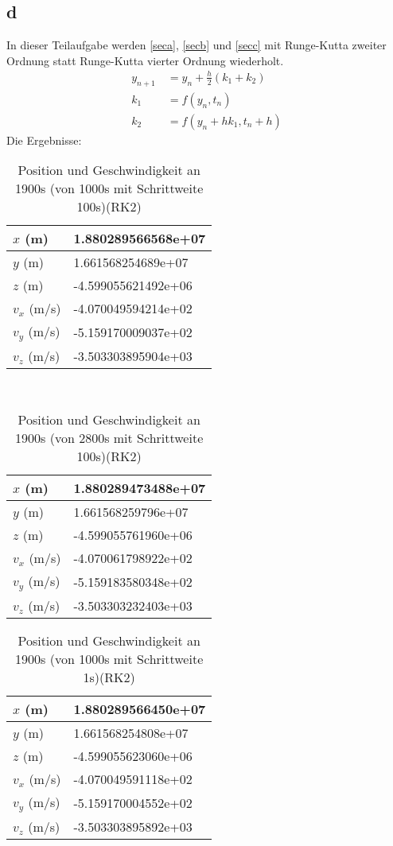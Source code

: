 \subsection{d}
In dieser Teilaufgabe werden \ref{seca}, \ref{secb} und \ref{secc} mit Runge-Kutta zweiter Ordnung statt Runge-Kutta vierter Ordnung wiederholt. 
\begin{align}
	y_{n+1} & \ = y_n + \frac{h}{2}(k_1 + k_2) \\
	k_1 & \ = f(y_n,t_n) \\
	k_2 & \ = f(y_n + hk_1, t_n + h)
\end{align}
Die Ergebnisse:
\begin{table}[htbp]\centering
	\begin{tabular}{|l|l|}
		\hline
		$x$ (m)     & 1.880289566568e+07  \\ \hline
		$y$ (m)     & 1.661568254689e+07  \\ \hline
		$z$ (m)     & -4.599055621492e+06 \\ \hline
		$v_x$ (m/s) & -4.070049594214e+02 \\ \hline
		$v_y$ (m/s) & -5.159170009037e+02 \\ \hline
		$v_z$ (m/s) & -3.503303895904e+03 \\ \hline
	\end{tabular}
	\caption{Position und Geschwindigkeit an 1900s (von 1000s mit Schrittweite 100s)(RK2)}
\end{table}\\
\begin{table}[htbp]\centering
	\begin{tabular}{|l|l|}
		\hline
		$x$ (m)     & 1.880289473488e+07  \\ \hline
		$y$ (m)     & 1.661568259796e+07  \\ \hline
		$z$ (m)     & -4.599055761960e+06 \\ \hline
		$v_x$ (m/s) & -4.070061798922e+02 \\ \hline
		$v_y$ (m/s) & -5.159183580348e+02 \\ \hline
		$v_z$ (m/s) & -3.503303232403e+03 \\ \hline
	\end{tabular}
	\caption{Position und Geschwindigkeit an 1900s (von 2800s mit Schrittweite 100s)(RK2)}
\end{table}
\clearpage
\begin{table}[htbp]\centering
	\begin{tabular}{|l|l|}
		\hline
		$x$ (m)     & 1.880289566450e+07  \\ \hline
		$y$ (m)     & 1.661568254808e+07  \\ \hline
		$z$ (m)     & -4.599055623060e+06 \\ \hline
		$v_x$ (m/s) & -4.070049591118e+02 \\ \hline
		$v_y$ (m/s) & -5.159170004552e+02 \\ \hline
		$v_z$ (m/s) & -3.503303895892e+03 \\ \hline
	\end{tabular}
	\caption{Position und Geschwindigkeit an 1900s (von 1000s mit Schrittweite 1s)(RK2)}
\end{table}
